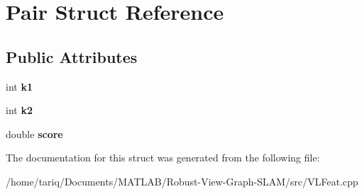\hypertarget{structPair}{}\section{Pair Struct Reference}
\label{structPair}
\subsection*{Public Attributes}
\begin{DoxyCompactItemize}
\item 
int {\bfseries k1}\hypertarget{structPair_a845d12e75b8a55691f3bb6f48b659968}{}\label{structPair_a845d12e75b8a55691f3bb6f48b659968}

\item 
int {\bfseries k2}\hypertarget{structPair_a663b93b2a769419e7d325fc13a69be55}{}\label{structPair_a663b93b2a769419e7d325fc13a69be55}

\item 
double {\bfseries score}\hypertarget{structPair_aa8d11c69d77a839c11ff2668360a1ce7}{}\label{structPair_aa8d11c69d77a839c11ff2668360a1ce7}

\end{DoxyCompactItemize}


The documentation for this struct was generated from the following file\+:\begin{DoxyCompactItemize}
\item 
/home/tariq/\+Documents/\+M\+A\+T\+L\+A\+B/\+Robust-\/\+View-\/\+Graph-\/\+S\+L\+A\+M/src/V\+L\+Feat.\+cpp\end{DoxyCompactItemize}

